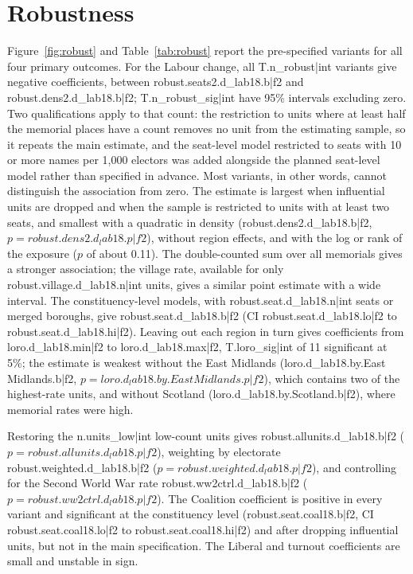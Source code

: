 \documentclass[11pt,a4paper]{article}
\begin{document}
\section{Robustness}
Figure~\ref{fig:robust} and Table~\ref{tab:robust} report the pre-specified variants for all four primary outcomes. For the Labour change, all {{T.n_robust|int}} variants give negative coefficients, between {{robust.seats2.d_lab18.b|f2}} and {{robust.dens2.d_lab18.b|f2}}; {{T.n_robust_sig|int}} have 95\% intervals excluding zero. Two qualifications apply to that count: the restriction to units where at least half the memorial places have a count removes no unit from the estimating sample, so it repeats the main estimate, and the seat-level model restricted to seats with 10 or more names per 1,000 electors was added alongside the planned seat-level model rather than specified in advance. Most variants, in other words, cannot distinguish the association from zero. The estimate is largest when influential units are dropped and when the sample is restricted to units with at least two seats, and smallest with a quadratic in density ({{robust.dens2.d_lab18.b|f2}}, $p={{robust.dens2.d_lab18.p|f2}}$), without region effects, and with the log or rank of the exposure ($p$ of about 0.11). The double-counted sum over all memorials gives a stronger association; the village rate, available for only {{robust.village.d_lab18.n|int}} units, gives a similar point estimate with a wide interval. The constituency-level models, with {{robust.seat.d_lab18.n|int}} seats or merged boroughs, give {{robust.seat.d_lab18.b|f2}} (CI {{robust.seat.d_lab18.lo|f2}} to {{robust.seat.d_lab18.hi|f2}}). Leaving out each region in turn gives coefficients from {{loro.d_lab18.min|f2}} to {{loro.d_lab18.max|f2}}, {{T.loro_sig|int}} of 11 significant at 5\%; the estimate is weakest without the East Midlands ({{loro.d_lab18.by.East Midlands.b|f2}}, $p={{loro.d_lab18.by.East Midlands.p|f2}}$), which contains two of the highest-rate units, and without Scotland ({{loro.d_lab18.by.Scotland.b|f2}}), where memorial rates were high.

Restoring the {{n.units_low|int}} low-count units gives {{robust.allunits.d_lab18.b|f2}} ($p={{robust.allunits.d_lab18.p|f2}}$), weighting by electorate {{robust.weighted.d_lab18.b|f2}} ($p={{robust.weighted.d_lab18.p|f2}}$), and controlling for the Second World War rate {{robust.ww2ctrl.d_lab18.b|f2}} ($p={{robust.ww2ctrl.d_lab18.p|f2}}$). The Coalition coefficient is positive in every variant and significant at the constituency level ({{robust.seat.coal18.b|f2}}, CI {{robust.seat.coal18.lo|f2}} to {{robust.seat.coal18.hi|f2}}) and after dropping influential units, but not in the main specification. The Liberal and turnout coefficients are small and unstable in sign.
\end{document}
